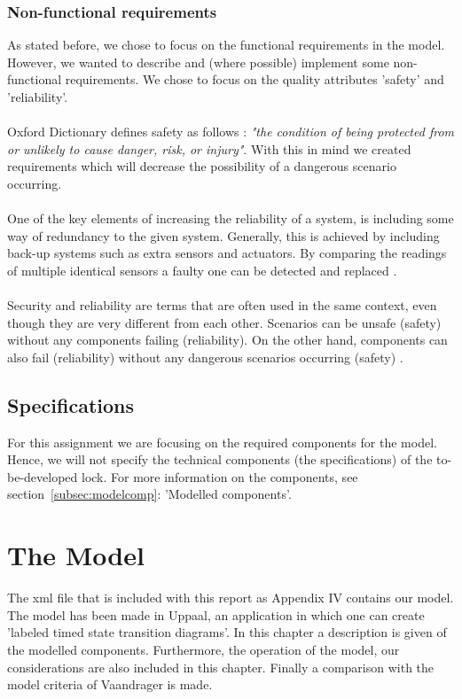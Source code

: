 \documentclass{article}
\begin{document}
        \subsubsection{Non-functional requirements}
        As stated before, we chose to focus on the functional requirements in the model. However, we wanted to describe and (where possible) implement some non-functional requirements. We chose to focus on the quality attributes 'safety' and 'reliability'. \\\\
        Oxford Dictionary defines safety as follows : \textit{"the condition of being protected from or unlikely to cause danger, risk, or injury"}. With this in mind we created requirements which will decrease the possibility of a dangerous scenario occurring. \\\\
        One of the key elements of increasing the reliability of a system, is including some way of redundancy to the given system. Generally, this is achieved by including back-up systems such as extra sensors and actuators. By comparing the readings of multiple identical sensors a faulty one can be detected and replaced \cite{billinton1992reliability}. \\\\
        Security and reliability are terms that are often used in the same context, even though they are very different from each other.  Scenarios can be unsafe (safety) without any components failing (reliability). On the other hand, components can also fail (reliability) without any dangerous scenarios occurring (safety) \cite{leveson2011engineering}. 
        
       \subsection{Specifications}
        For this assignment we are focusing on the required components for the model. Hence, we will not specify the technical components (the specifications) of the to-be-developed lock. For more information on the components, see section~\ref{subsec:modelcomp}: 'Modelled components'.  
        


\newpage
\section{The Model}
The xml file that is included with this report as Appendix IV contains our model. The model has been made in Uppaal, an application in which one can create 'labeled timed state transition diagrams'. In this chapter a description is given of the modelled components. Furthermore, the operation of the model, our considerations are also included in this chapter. Finally a comparison with the model criteria of Vaandrager is made. 
\end{document}
